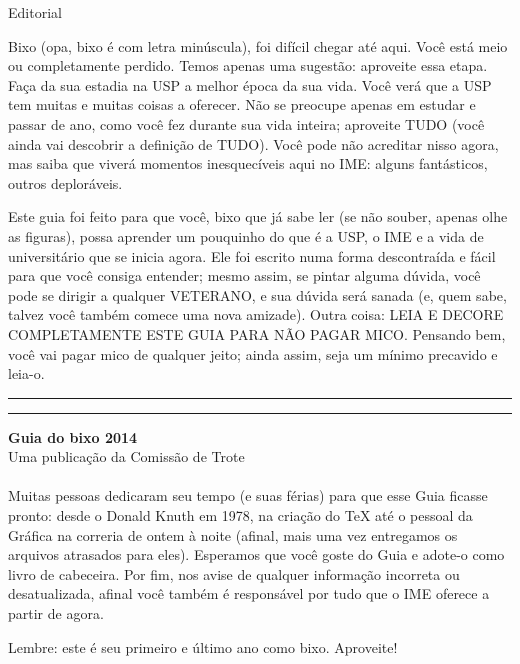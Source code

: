 \begin{editorial}{Editorial}

Bixo (opa, bixo é com letra minúscula), foi difícil chegar até aqui. Você está
meio ou completamente perdido. Temos apenas uma sugestão: aproveite essa etapa.
Faça da sua estadia na USP a melhor época da sua vida. Você verá que a USP tem
muitas e muitas coisas a oferecer. Não se preocupe apenas em estudar e passar de
ano, como você fez durante sua vida inteira; aproveite TUDO (você ainda vai
descobrir a definição de TUDO). Você pode não acreditar nisso agora, mas saiba
que viverá momentos inesquecíveis aqui no IME: alguns fantásticos, outros deploráveis.

Este guia foi feito para que você, bixo que já sabe ler (se não souber, apenas olhe
as figuras), possa aprender um pouquinho do que é a USP, o IME e a vida de
universitário que se inicia agora. Ele foi escrito numa forma descontraída e
fácil para que você consiga entender; mesmo assim, se pintar alguma dúvida,
você pode se dirigir a qualquer VETERANO, e sua dúvida será sanada (e, quem sabe,
talvez você também comece uma nova amizade). Outra coisa: LEIA E DECORE
COMPLETAMENTE ESTE GUIA PARA NÃO PAGAR MICO. Pensando bem, você vai pagar mico
de qualquer jeito; ainda assim, seja um mínimo precavido e leia-o.

\rule{\textwidth}{0.5ex}\rule{2ex}{0.5ex}


{\large\bf Guia do bixo 2014} \\
Uma publicação da Comissão de Trote

\paragraph{}
Muitas pessoas dedicaram seu tempo (e suas férias) para que esse Guia ficasse pronto: desde o
Donald Knuth em 1978, na criação do \TeX\makebox{} até o pessoal da Gráfica na correria de
ontem à noite (afinal, mais uma vez entregamos os arquivos atrasados para eles).
Esperamos que você goste do Guia e adote-o como livro de cabeceira. Por fim,
nos avise de qualquer informação incorreta ou desatualizada, afinal você também é
responsável por tudo que o IME oferece a partir de agora.

Lembre: este é seu primeiro e último ano como bixo. Aproveite!


\end{editorial}
